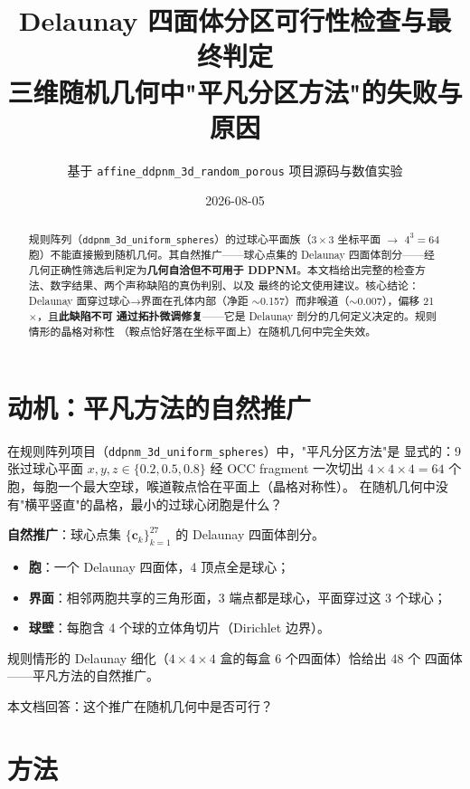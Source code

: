 \documentclass[UTF8,zihao=-4]{ctexart}
\newcommand{\cc}{\bm c}
\begin{document}
\title{\textbf{Delaunay 四面体分区可行性检查与最终判定}\\[4pt]
\large 三维随机几何中"平凡分区方法"的失败与原因}
\author{基于 \texttt{affine\_ddpnm\_3d\_random\_porous} 项目源码与数值实验}
\date{2026-08-05}
\maketitle

\begin{abstract}
规则阵列（\texttt{ddpnm\_3d\_uniform\_spheres}）的过球心平面族（$3\times3$
坐标平面 $\to$ $4^3=64$ 胞）不能直接搬到随机几何。其自然推广——球心点集的
Delaunay 四面体剖分——经几何正确性筛选后判定为\textbf{几何自洽但不可用于
DDPNM}。本文档给出完整的检查方法、数字结果、两个声称缺陷的真伪判别、以及
最终的论文使用建议。核心结论：Delaunay 面穿过球心→界面在孔体内部（净距
$\sim$0.157）而非喉道（$\sim$0.007），偏移 21$\times$，且\textbf{此缺陷不可
通过拓扑微调修复}——它是 Delaunay 剖分的几何定义决定的。规则情形的晶格对称性
（鞍点恰好落在坐标平面上）在随机几何中完全失效。
\end{abstract}

\section{动机：平凡方法的自然推广}

在规则阵列项目（\texttt{ddpnm\_3d\_uniform\_spheres}）中，"平凡分区方法"是
显式的：9 张过球心平面 $x,y,z\in\{0.2,0.5,0.8\}$ 经 OCC fragment 一次切出
$4\times4\times4=64$ 个胞，每胞一个最大空球，喉道鞍点恰在平面上（晶格对称性）。
在随机几何中没有"横平竖直"的晶格，最小的过球心闭胞是什么？

\textbf{自然推广}：球心点集 $\{\cc_k\}_{k=1}^{27}$ 的 Delaunay 四面体剖分。
\begin{itemize}
  \item \textbf{胞}：一个 Delaunay 四面体，4 顶点全是球心；
  \item \textbf{界面}：相邻两胞共享的三角形面，3 端点都是球心，平面穿过这 3 个球心；
  \item \textbf{球壁}：每胞含 4 个球的立体角切片（Dirichlet 边界）。
\end{itemize}

规则情形的 Delaunay 细化（$4\times4\times4$ 盒的每盒 6 个四面体）恰给出 48 个
四面体——平凡方法的自然推广。

本文档回答：这个推广在随机几何中是否可行？

\section{方法}
\end{document}
